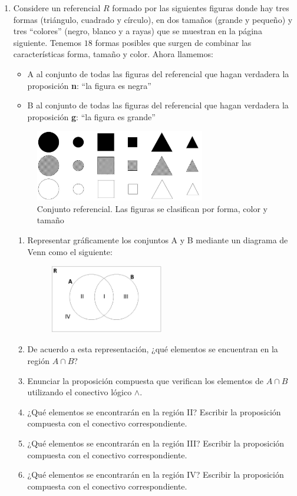 \documentclass[12pt]{article}
\theoremstyle{definition}
\theoremstyle{remark}
\begin{document}
\begin{enumerate}
\item Considere un referencial $R$ formado por las siguientes figuras donde hay tres formas (triángulo, cuadrado y círculo), en dos tamaños (grande y pequeño) y  tres “colores” (negro, blanco y a rayas) que se muestran en la página siguiente. Tenemos $18$ formas posibles que surgen de combinar las características forma, tamaño y color.  Ahora llamemos:
\begin{itemize}
\item A al conjunto de todas las figuras del referencial que hagan verdadera la proposición \textbf{n}: “la figura es negra”
\item B al conjunto de todas las figuras del referencial que hagan verdadera la proposición \textbf{g}: “la figura es grande” 
\end{itemize}
\begin{figure}[H]
\centering
\includegraphics[width=0.7\textwidth]{tp3_fig1}
\caption{Conjunto referencial. Las figuras se clasifican por forma, color y tamaño}
\end{figure}
\begin{enumerate}
\item Representar gráficamente los conjuntos A y B mediante un diagrama de Venn como el siguiente: 
\begin{figure}[H]
\centering
\includegraphics[width=0.5\textwidth]{tp3_fig2}
\end{figure}
\item De acuerdo a esta representación, ¿qué elementos se encuentran en la región $A\cap B$?
\item Enunciar la proposición compuesta que verifican los elementos de $A\cap B$ utilizando el conectivo lógico $\wedge$.
\item ¿Qué elementos se encontrarán en la región II? Escribir la proposición compuesta con el conectivo correspondiente.
\item ¿Qué elementos se encontrarán en la región III? Escribir la proposición compuesta con el conectivo correspondiente.
\item ¿Qué elementos se encontrarán en la región IV? Escribir la proposición compuesta con el conectivo correspondiente.
\end{enumerate}


\end{enumerate}
\end{document}
